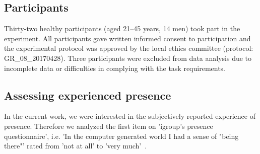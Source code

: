 \subsection{Participants} Thirty-two healthy participants (aged 21--45 years, 14 men) took part in the
experiment. All participants gave written informed consent to participation and the experimental protocol was approved by the local ethics committee (protocol: GR\_08\_20170428). Three participants were excluded from data analysis due to incomplete data or difficulties in complying with the task requirements.

\subsection{Assessing experienced presence} In the current work, we were interested in the subjectively reported experience of presence. Therefore we analyzed the first item on 'igroup's presence questionnaire', i.e. 'In the computer generated world I had a sense of "being there"' rated from 'not at all' to 'very much'~\cite{ipq, slaterQ1}.
